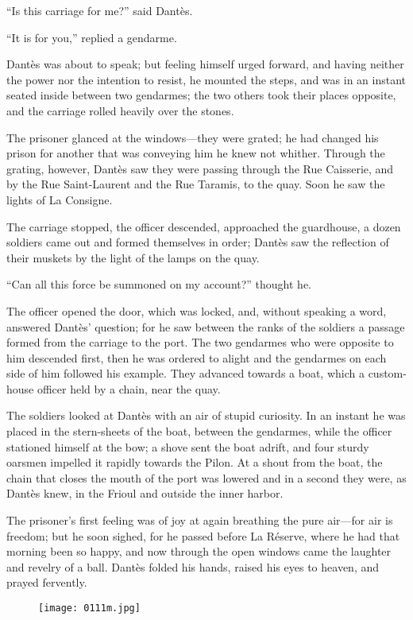 “Is this carriage for me?” said Dantès.

“It is for you,” replied a gendarme.

Dantès was about to speak; but feeling himself urged forward, and
having neither the power nor the intention to resist, he mounted the
steps, and was in an instant seated inside between two gendarmes; the
two others took their places opposite, and the carriage rolled heavily
over the stones.

The prisoner glanced at the windows—they were grated; he had changed
his prison for another that was conveying him he knew not whither.
Through the grating, however, Dantès saw they were passing through the
Rue Caisserie, and by the Rue Saint-Laurent and the Rue Taramis, to the
quay. Soon he saw the lights of La Consigne.

The carriage stopped, the officer descended, approached the guardhouse,
a dozen soldiers came out and formed themselves in order; Dantès saw
the reflection of their muskets by the light of the lamps on the quay.

“Can all this force be summoned on my account?” thought he.

The officer opened the door, which was locked, and, without speaking a
word, answered Dantès’ question; for he saw between the ranks of the
soldiers a passage formed from the carriage to the port. The two
gendarmes who were opposite to him descended first, then he was ordered
to alight and the gendarmes on each side of him followed his example.
They advanced towards a boat, which a custom-house officer held by a
chain, near the quay.

The soldiers looked at Dantès with an air of stupid curiosity. In an
instant he was placed in the stern-sheets of the boat, between the
gendarmes, while the officer stationed himself at the bow; a shove sent
the boat adrift, and four sturdy oarsmen impelled it rapidly towards
the Pilon. At a shout from the boat, the chain that closes the mouth of
the port was lowered and in a second they were, as Dantès knew, in the
Frioul and outside the inner harbor.

The prisoner’s first feeling was of joy at again breathing the pure
air—for air is freedom; but he soon sighed, for he passed before La
Réserve, where he had that morning been so happy, and now through the
open windows came the laughter and revelry of a ball. Dantès folded his
hands, raised his eyes to heaven, and prayed fervently.

\begin{figure}[ht]
\texttt{[image: 0111m.jpg]}
\end{figure}

